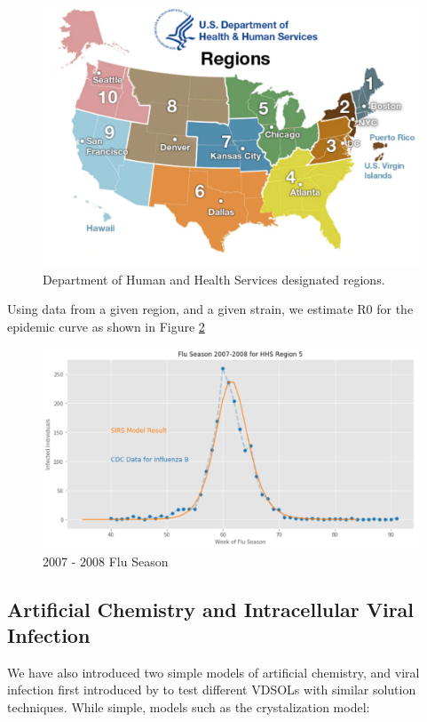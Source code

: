 \documentclass[11pt]{article}
\begin{document}
\begin{figure}
\includegraphics[width=\textwidth]{figs/regionsmap.pdf}
\caption{Department of Human and Health Services designated regions.}
\label{Fig:Regions}
\end{figure}

Using data from a given region, and a given strain, we estimate R0 for the epidemic curve as shown in Figure \ref{Fig:R0}

\begin{figure}
\includegraphics[width=\textwidth]{figs/2007-2008-SIRS.pdf}
\caption{2007 - 2008 Flu Season}
\label{Fig:R0}
\end{figure}

\subsection{Artificial Chemistry and Intracellular Viral Infection}

We have also introduced two simple models of artificial chemistry, and viral infection first introduced by \cite{srivastava2002stochastic,haseltine2002approximate} to test different VDSOLs with similar solution techniques.  While simple, models such as the crystalization model:
\end{document}
